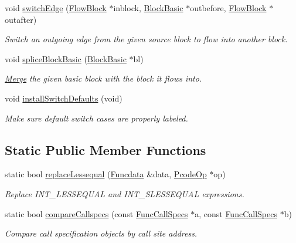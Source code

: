 \begin{DoxyCompactItemize}
void \mbox{\hyperlink{class_funcdata_a5ba1555023c49006ed39936b9a40aba4}{switch\+Edge}} (\mbox{\hyperlink{class_flow_block}{Flow\+Block}} $\ast$inblock, \mbox{\hyperlink{class_block_basic}{Block\+Basic}} $\ast$outbefore, \mbox{\hyperlink{class_flow_block}{Flow\+Block}} $\ast$outafter)
\begin{DoxyCompactList}\small\item\em Switch an outgoing edge from the given {\itshape source} block to flow into another block. \end{DoxyCompactList}\item 
void \mbox{\hyperlink{class_funcdata_a9f0c9d7c7fb4217731ae45f7848e4034}{splice\+Block\+Basic}} (\mbox{\hyperlink{class_block_basic}{Block\+Basic}} $\ast$bl)
\begin{DoxyCompactList}\small\item\em \mbox{\hyperlink{class_merge}{Merge}} the given basic block with the block it flows into. \end{DoxyCompactList}\item 
void \mbox{\hyperlink{class_funcdata_a9021f01b57f8704db66341bc7f65f39f}{install\+Switch\+Defaults}} (void)
\begin{DoxyCompactList}\small\item\em Make sure default switch cases are properly labeled. \end{DoxyCompactList}\end{DoxyCompactItemize}
\subsection*{Static Public Member Functions}
\begin{DoxyCompactItemize}
\item 
static bool \mbox{\hyperlink{class_funcdata_a8af7249a90794ba6001046e28c0aeb5c}{replace\+Lessequal}} (\mbox{\hyperlink{class_funcdata}{Funcdata}} \&data, \mbox{\hyperlink{class_pcode_op}{Pcode\+Op}} $\ast$op)
\begin{DoxyCompactList}\small\item\em Replace I\+N\+T\+\_\+\+L\+E\+S\+S\+E\+Q\+U\+AL and I\+N\+T\+\_\+\+S\+L\+E\+S\+S\+E\+Q\+U\+AL expressions. \end{DoxyCompactList}\item 
static bool \mbox{\hyperlink{class_funcdata_a4456bfc523a4527c9fd924ecadacec63}{compare\+Callspecs}} (const \mbox{\hyperlink{class_func_call_specs}{Func\+Call\+Specs}} $\ast$a, const \mbox{\hyperlink{class_func_call_specs}{Func\+Call\+Specs}} $\ast$b)
\begin{DoxyCompactList}\small\item\em Compare call specification objects by call site address. \end{DoxyCompactList}\end{DoxyCompactItemize}


